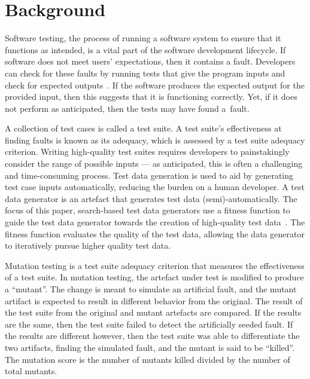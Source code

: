 \section{Background}\label{sec:background}


Software testing, the process of running a software system to ensure that it functions as intended, is a vital part of
the software development lifecycle. If software does not meet users' expectations, then it contains a fault.  Developers
can check for these faults by running tests that give the program inputs and check for expected
outputs~\cite{ammann2008}.  If the software produces the expected output for the provided input, then this suggests that
it is functioning correctly.  Yet, if it does not perform as anticipated, then the tests may have found \mbox{a fault}.


A collection of test cases is called a test suite. A test suite's effectiveness at finding faults is known as its
adequacy, which is assessed by a test suite adequacy criterion.  Writing high-quality test suites requires developers to
painstakingly consider the range of possible inputs --- as anticipated, this is often a challenging and time-consuming
process. Test data generation is used to aid by generating test case inputs automatically, reducing the burden on a
human developer. A test data generator is an artefact that generates test data (semi)-automatically.  The focus of this
paper, search-based test data generators use a fitness function to guide the test data generator towards the creation of
high-quality test data~\cite{STVR:STVR294}. The fitness function evaluates the quality of the test data, allowing the
data generator to iteratively pursue higher quality test data.


Mutation testing is a test suite adequacy criterion that measures the effectiveness of a test suite. In mutation
testing, the artefact under test is modified to produce a ``mutant''. The change is meant to simulate an artificial
fault, and the mutant artifact is expected to result in different behavior from the original. The result of the test
suite from the original and mutant artefacts are compared. If the results are the same, then the test suite failed to
detect the artificially seeded fault. If the results are different however, then the test suite was able to
differentiate the two artifacts, finding the simulated fault, and the mutant is said to be ``killed''.  The mutation
score is the number of mutants killed divided by the number of total mutants.

